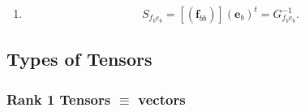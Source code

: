 \documentclass[aps,preprint]{revtex4}
\begin{document}
\begin{enumerate}
\begin{enumerate}
\begin{equation}
\end{equation}%
and \label{covaraiant - covariant coordinate transformation} 
\begin{equation}
\mathcal{R}_{e_{b}}\left( w_{d}\right) ^{j}=\sum_{1\leq k\leq r}\mathcal{R}%
_{e_{b}}\left( S_{f_{b}e_{b}}^{-1}\right) _{k}^{j}\mathcal{R}_{e_{b}}\left(
v\right) ^{k}=\sum_{1\leq k\leq r}\mathcal{R}_{e_{b}}\left(
G_{f_{b}e_{b}}\right) _{k}^{j}\mathcal{R}_{e_{b}}\left( v_{d}\right) ^{k},
\end{equation}%
where $G_{f_{b}e_{b}}$ is the metric operator between the bases $\left( 
\boldsymbol{f}\right) $ and $\left( \boldsymbol{e}\right) $ and is the
inverse of the overlap operator btween these bases i.e.

\item 
\begin{equation}
S_{f_{b}e_{b}}=\left[ \left( \overset{}{\boldsymbol{f}_{bb}}\right) \right]
\left( \overset{}{\boldsymbol{e}_{b}}\right) ^{t}=G_{f_{b}e_{b}}^{-1}.
\end{equation}
\end{enumerate}
\end{enumerate}

\subsection{Types of Tensors}

\subsubsection{Rank 1 Tensors $\equiv $ vectors}
\end{document}
